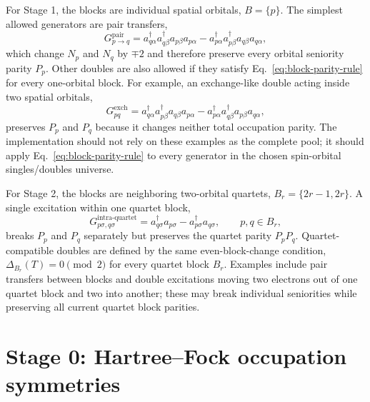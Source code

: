 \documentclass[11pt]{article}
\begin{document}
For Stage 1, the blocks are individual spatial orbitals, $B=\{p\}$. The simplest allowed generators are pair transfers,
\begin{equation}
    G_{p\rightarrow q}^{\mathrm{pair}}
    =a_{q\alpha}^{\dagger}a_{q\beta}^{\dagger}a_{p\beta}a_{p\alpha}
     -a_{p\alpha}^{\dagger}a_{p\beta}^{\dagger}a_{q\beta}a_{q\alpha},
    \label{eq:pair-generator-explicit}
\end{equation}
which change $N_p$ and $N_q$ by $\mp 2$ and therefore preserve every orbital seniority parity $P_p$. Other doubles are also allowed if they satisfy Eq.~\eqref{eq:block-parity-rule} for every one-orbital block. For example, an exchange-like double acting inside two spatial orbitals,
\begin{equation}
    G_{pq}^{\mathrm{exch}}
    =a_{q\alpha}^{\dagger}a_{p\beta}^{\dagger}a_{q\beta}a_{p\alpha}
     -a_{p\alpha}^{\dagger}a_{q\beta}^{\dagger}a_{p\beta}a_{q\alpha},
\end{equation}
preserves $P_p$ and $P_q$ because it changes neither total occupation parity. The implementation should not rely on these examples as the complete pool; it should apply Eq.~\eqref{eq:block-parity-rule} to every generator in the chosen spin-orbital singles/doubles universe.

For Stage 2, the blocks are neighboring two-orbital quartets, $B_r=\{2r-1,2r\}$. A single excitation within one quartet block,
\begin{equation}
    G_{p\sigma,q\sigma}^{\mathrm{intra\text{-}quartet}}
    =a_{q\sigma}^{\dagger}a_{p\sigma}
     -a_{p\sigma}^{\dagger}a_{q\sigma},
    \qquad p,q\in B_r,
    \label{eq:intra-quartet-single}
\end{equation}
breaks $P_p$ and $P_q$ separately but preserves the quartet parity $P_pP_q$. Quartet-compatible doubles are defined by the same even-block-change condition, $\Delta_{B_r}(T)=0\pmod 2$ for every quartet block $B_r$. Examples include pair transfers between blocks and double excitations moving two electrons out of one quartet block and two into another; these may break individual seniorities while preserving all current quartet block parities.


\section{Stage 0: Hartree--Fock occupation symmetries}
\end{document}
